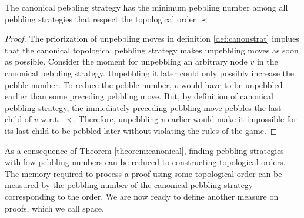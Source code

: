\begin{theorem}
\label{theorem:canonical}
The canonical pebbling strategy has the minimum pebbling number among all pebbling strategies that respect the topological order $\prec$.
\end{theorem}
\begin{proof}
%
The priorization of unpebbling moves in definition \ref{def:canonstrat} implues that the canonical topological pebbling strategy makes unpebbling moves as soon as possible.
Consider the moment for unpebbling an arbitrary node $v$ in the canonical pebbling strategy. 
Unpebbling it later could only possibly increase the pebble number. 
To reduce the pebble number, $v$ would have to be unpebbled earlier than some preceding pebbling move. 
But, by definition of canonical pebbling strategy, the immediately preceding pebbling move pebbles the last child of $v$ w.r.t. $\prec$. 
Therefore, unpebbling $v$ earlier would make it impossible for its last child to be pebbled later without violating the rules of the game.
\end{proof}

As a consequence of Theorem \ref{theorem:canonical}, finding pebbling strategies with low pebbling numbers can be reduced to constructing topological orders.
The memory required to process a proof using some topological order can be measured by the pebbling number of the canonical pebbling strategy corresponding to the order.
We are now ready to define another measure on proofs, which we call space.

